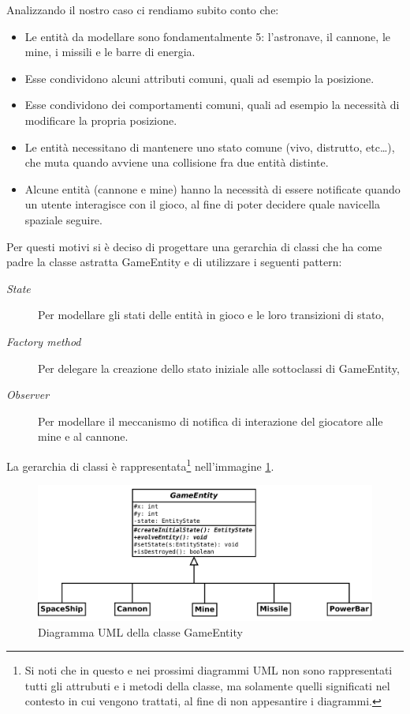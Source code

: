 \documentclass[a4paper,12pt]{article}
\begin{document}
Analizzando il nostro caso ci rendiamo subito conto che:
\begin{itemize}
\item Le entit\`a da modellare sono fondamentalmente 5: l'astronave, il cannone, le mine, i missili e le barre di energia.
\item Esse condividono alcuni attributi comuni, quali ad esempio la posizione.
\item Esse condividono dei comportamenti comuni, quali ad esempio la necessit\`a di modificare la propria posizione.
\item Le entit\`a necessitano di mantenere uno stato comune (vivo, distrutto, etc\dots{}), che muta quando avviene una collisione fra due entit\`a distinte.
\item Alcune entit\`a (cannone e mine) hanno la necessit\`a di essere notificate quando un utente interagisce con il gioco, al fine di poter decidere quale navicella spaziale seguire.
\end{itemize}

Per questi motivi si \`e deciso di progettare una gerarchia di classi che ha come padre la classe astratta \textsf{GameEntity} e di utilizzare i seguenti pattern:
\begin{description}
\item[\emph{State}] Per modellare gli stati delle entit\`a in gioco e le loro transizioni di stato,
\item[\emph{Factory method}] Per delegare la creazione dello stato iniziale alle sottoclassi di \textsf{GameEntity},
\item[\emph{Observer}] Per modellare il meccanismo di notifica di interazione del giocatore alle mine e al cannone.
\end{description}

La gerarchia di classi \`e rappresentata\footnote{Si noti che in questo e nei prossimi diagrammi UML non sono rappresentati tutti gli attrubuti e i metodi della classe, ma solamente quelli significati nel contesto in cui vengono trattati, al fine di non appesantire i diagrammi.} nell'immagine \ref{img:GameEntity}.

\begin{figure}[ht]
\centering
\includegraphics[width=15cm]{GameEntity.pdf}
\caption{Diagramma UML della classe \textsf{GameEntity}}
\label{img:GameEntity}
\end{figure}
\end{document}
